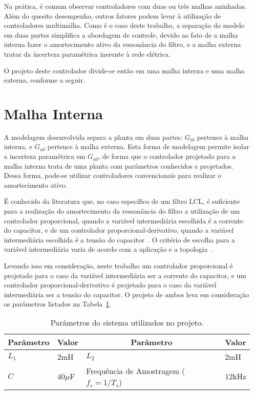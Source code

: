     Na prática, é comum observar controladores com duas ou três malhas aninhadas. Além do quesito desempenho, outros fatores podem levar à utilização de controladores multimalha. Como é o caso deste trabalho, a separação do modelo em duas partes simplifica a abordagem de controle, devido ao fato de a malha interna fazer o amortecimento ativo da ressonância do filtro, e a malha externa tratar da incerteza paramétrica inerente à rede elétrica.

    O projeto deste controlador divide-se então em uma malha interna e uma malha externa, conforme a seguir.

\section{Malha Interna}

    A modelagem desenvolvida separa a planta em duas partes: $G_{id}$ pertence à malha interna, e $G_{od}$ pertence à malha externa. Esta forma de modelagem permite isolar a incerteza paramétrica em $G_{od}$, de forma que o controlador projetado para a malha interna trata de uma planta com parâmetros conhecidos e projetados. Dessa forma, pode-se utilizar controladores convencionais para realizar o amortecimento ativo.

    É conhecido da literatura que, no caso específico de um filtro LCL, é suficiente para a realização do amortecimento da ressonância do filtro a utilização de um controlador proporcional, quando a variável intermediária escolhida é a corrente do capacitor, e de um controlador proporcional-derivativo, quando a variável intermediária escolhida é a tensão do capacitor~\cite{ref:DANNEHL}. O critério de escolha para a variável intermediária varia de acordo com a aplicação e a topologia~\cite{ref:POH}.

    Levando isso em consideração, neste trabalho um controlador proporcional é projetado para o caso da variável intermediária ser a corrente do capacitor, e um controlador proporcional-derivativo é projetado para o caso da variável intermediária ser a tensão do capacitor. O projeto de ambos leva em consideração os parâmetros listados na Tabela~\ref{tab:sim_parameters}.

    \begin{table}[htb]
        \renewcommand{\arraystretch}{1.35}
        \setlength{\tabcolsep}{1.2mm}
        \caption{Parâmetros do sistema utilizados no projeto.}
        \label{tab:sim_parameters}
        \centering
        \begin{tabular}{l l l l}
            \hline
            \multicolumn{1}{c}{Parâmetro} & \multicolumn{1}{c}{Valor} &
            \multicolumn{1}{c}{Parâmetro} & \multicolumn{1}{c}{Valor} \\
            \hline
            $L_1$ &  $2$mH     &  $L_2$      &  $2$mH    \\
            $C$   &  $40\mu$F  & Frequência de Amostragem ($f_s = 1/T_s$) &  $12$kHz  \\
            \hline
        \end{tabular}
    \end{table}


